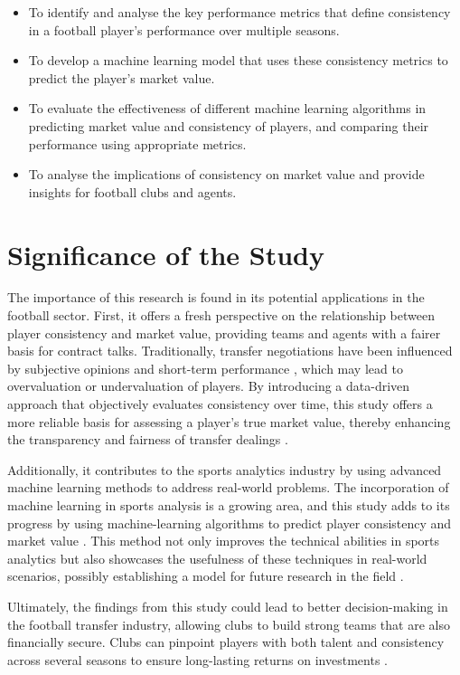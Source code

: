\documentclass[12pt, a4paper,oneside]{book}
\numberwithin{equation}{section}
\begin{document}
\begin{itemize}
    \item To identify and analyse the key performance metrics that define consistency in a football player's performance over multiple seasons.
    \item To develop a machine learning model that uses these consistency metrics to predict the player's market value.
    \item To evaluate the effectiveness of different machine learning algorithms in predicting market value and consistency of players, and comparing their performance using appropriate metrics.
    \item To analyse the implications of consistency on market value and provide insights for football clubs and agents.
\end{itemize}

\section{Significance of the Study}\label{sec:1.4}

The importance of this research is found in its potential applications in the football sector. First, it offers a fresh perspective on the relationship between player consistency and market value, providing teams and agents with a fairer basis for contract talks. Traditionally, transfer negotiations have been influenced by subjective opinions and short-term performance \cite{jones2018}, which may lead to overvaluation or undervaluation of players. By introducing a data-driven approach that objectively evaluates consistency over time, this study offers a more reliable basis for assessing a player's true market value, thereby enhancing the transparency and fairness of transfer dealings \cite{brown2019} .

Additionally, it contributes to the sports analytics industry by using advanced machine learning methods to address real-world problems. The incorporation of machine learning in sports analysis is a growing area, and this study adds to its progress by using machine-learning algorithms to predict player consistency and market value \cite{lopez2022}. This method not only improves the technical abilities in sports analytics but also showcases the usefulness of these techniques in real-world scenarios, possibly establishing a model for future research in the field \cite{martinez2020}.

Ultimately, the findings from this study could lead to better decision-making in the football transfer industry, allowing clubs to build strong teams that are also financially secure. Clubs can pinpoint players with both talent and consistency across several seasons to ensure long-lasting returns on investments \cite{taylor2018}.
\end{document}
